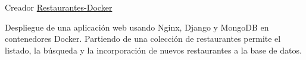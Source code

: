 \begin{cventries}
\cventry
{Creador} %
{\href{https://github.com/AythaE/CC-servicios_y_aplicaciones/tree/master/Practica2_PaaS}{Restaurantes-Docker}} %
{} %
{} %
{ %
	\begin{cvitems}
		\item {Despliegue de una aplicación web usando Nginx, Django y MongoDB en contenedores Docker. Partiendo de una colección de restaurantes permite el listado, la búsqueda y la incorporación de nuevos restaurantes a la base de datos. }
	\end{cvitems}
}


\end{cventries}